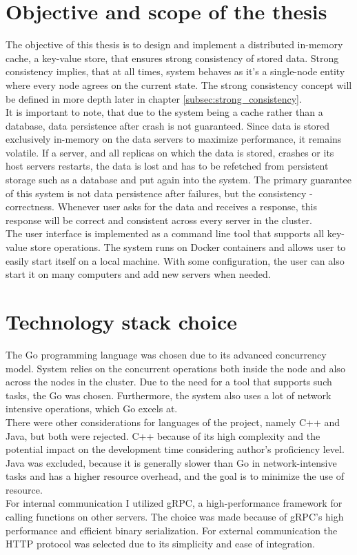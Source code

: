 \documentclass[shortabstract]{iithesis}
\begin{document}
\section{Objective and scope of the thesis}

The objective of this thesis is to design and implement a distributed in-memory cache, a key-value store, that ensures strong consistency of stored data. Strong consistency implies, that at all times, system behaves as it's a single-node entity where every node agrees on the current state. The strong consistency concept will be defined in more depth later in chapter \ref{subsec:strong_consistency}. \\
It is important to note, that due to the system being a cache rather than a database, data persistence after crash is not guaranteed. Since data is stored exclusively in-memory on the data servers to maximize performance, it remains volatile. If a server, and all replicas on which the data is stored, crashes or its host servers restarts, the data is lost and has to be refetched from persistent storage such as a database and put again into the system. The primary guarantee of this system is not data persistence after failures, but the consistency - correctness. Whenever user asks for the data and receives a response, this response will be correct and consistent across every server in the cluster. \\
The user interface is implemented as a command line tool that supports all key-value store operations. The system runs on Docker containers and allows user to easily start itself on a local machine. With some configuration, the user can also start it on many computers and add new servers when needed. 

\section{Technology stack choice}

The Go programming language was chosen due to its advanced concurrency model. System relies on the concurrent operations both inside the node and also across the nodes in the cluster. Due to the need for a tool that supports such tasks, the Go was chosen. Furthermore, the system also uses a lot of network intensive operations, which Go excels at.\\
There were other considerations for languages of the project, namely C++ and Java, but both were rejected. C++ because of its high complexity and the potential impact on the development time considering author's proficiency level. Java was excluded, because it is generally slower than Go in network-intensive tasks and has a higher resource overhead, and the goal is to minimize the use of resource. \\
For internal communication I utilized gRPC, a high-performance framework for calling functions on other servers. The choice was made because of gRPC's high performance and efficient binary serialization. For external communication the HTTP protocol was selected due to its simplicity and ease of integration.
\end{document}
